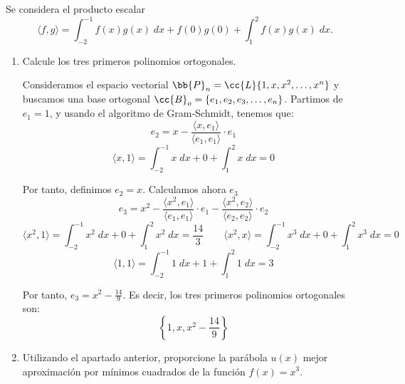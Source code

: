\begin{ejercicio}
    Se considera el producto escalar
    \begin{equation*}
        \langle f,g \rangle = \int_{-2}^{-1} f(x) g(x)\;dx + f(0) g(0) +\int_1^2f(x)g(x)\;dx.
    \end{equation*}

    \begin{enumerate}
        \item Calcule los tres primeros polinomios ortogonales.

        Consideramos el espacio vectorial $\bb{P}_n=\cc{L}\{1,x,x^2,\dots, x^n\}$ y buscamos una base ortogonal $\cc{B}_o = \{e_1, e_2, e_3, \dots, e_n\}$. Partimos de $e_1=1$, y usando el algoritmo de Gram-Schmidt, tenemos que:
        \begin{equation*}
            e_2 = x-\frac{\langle x, e_1\rangle}{\langle e_1, e_1\rangle} \cdot e_1
        \end{equation*}
        \begin{equation*}
            \langle x,1\rangle = \int_{-2}^{-1} x\;dx + 0 +\int_1^2 x\;dx = 0
        \end{equation*}

        Por tanto, definimos $e_2=x$. Calculamos ahora $e_3$
        \begin{equation*}
            e_3 = x^2-\frac{\langle x^2, e_1\rangle}{\langle e_1, e_1\rangle} \cdot e_1 -\frac{\langle x^2, e_2\rangle}{\langle e_2, e_2\rangle} \cdot e_2
        \end{equation*}
        \begin{equation*}
            \langle x^2,1\rangle = \int_{-2}^{-1} x^2\;dx + 0 +\int_1^2 x^2\;dx = \frac{14}{3}
            \qquad
            \langle x^2,x\rangle = \int_{-2}^{-1} x^3\;dx + 0 +\int_1^2 x^3\;dx = 0
        \end{equation*}
        \begin{equation*}
            \langle 1,1\rangle = \int_{-2}^{-1} 1\;dx + 1 +\int_1^2 1\;dx = 3
        \end{equation*}

        Por tanto, $e_3=x^2-\frac{14}{9}$. Es decir, los tres primeros polinomios ortogonales son:
        \begin{equation*}
            \left\{1,x,x^2-\frac{14}{9}\right\}
        \end{equation*}

        
        \item Utilizando el apartado anterior, proporcione la parábola $u(x)$ mejor aproximación por mínimos cuadrados de la función $f(x) = x^3$.


\end{enumerate}
\end{ejercicio}
